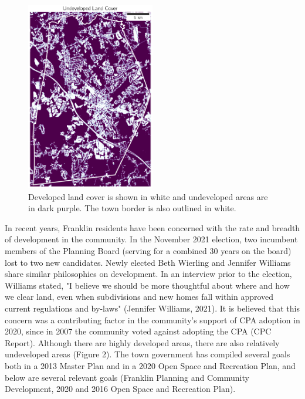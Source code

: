 \documentclass[12pt, stu, floatsintext,table]{apa7}
\begin{document}
\begin{figure}
\includegraphics[width=0.5\textwidth]{figures/developed.png}
\caption{Developed land cover is shown in white and undeveloped areas are in dark purple. The town border is also outlined in white. }
\end{figure}
In recent years, Franklin residents have been concerned with the rate and breadth of development in the community. In the November 2021 election, two incumbent members of the Planning Board (serving for a combined 30 years on the board) lost to two new candidates. Newly elected Beth Wierling and Jennifer Williams share similar philosophies on development. In an interview prior to the election, Williams stated, "I believe we should be more thoughtful about where and how we clear land, even when subdivisions and new homes fall within approved current regulations and by-laws" (Jennifer Williams, 2021). It is believed that this concern was a contributing factor in the community's support of CPA adoption in 2020, since in 2007 the community voted against adopting the CPA (CPC Report). Although there are highly developed areas, there are also relatively undeveloped areas (Figure 2). 
The town government has compiled several goals both in a 2013 Master Plan and in a 2020 Open Space and Recreation Plan, and below are several relevant goals (Franklin Planning and Community Development, 2020 and 2016 Open Space and Recreation Plan). 
\end{document}
